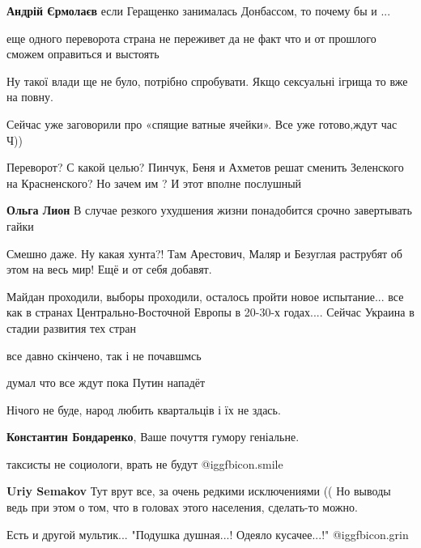 \begin{itemize}
\begin{itemize}
\textbf{Андрій Єрмолаєв} если Геращенко занималась Донбассом, то почему бы и ...
\end{itemize} %

еще одного переворота страна не переживет да не факт что и от прошлого сможем оправиться и выстоять

Ну такої влади ще не було, потрібно спробувати. Якщо сексуальні ігрища то вже на повну.

Сейчас уже заговорили про «спящие ватные ячейки». Все уже готово,ждут час Ч))

Переворот? С какой целью? Пинчук, Беня и Ахметов решат сменить Зеленского на Красненского? Но зачем им ? И этот вполне послушный

\begin{itemize} %
\textbf{Ольга Лион} В случае резкого ухудшения жизни понадобится срочно завертывать гайки
\end{itemize} %

Смешно даже. Ну какая хунта?! Там Арестович, Маляр и Безуглая раструбят об этом на весь мир! Ещё и от себя добавят.


Майдан проходили, выборы проходили, осталось пройти новое испытание... все как в
странах Центрально-Восточной Европы в 20-30-х годах.... Сейчас Украина в стадии
развития тех стран

все давно скінчено, так і не почавшмсь

думал что все ждут пока Путин нападёт

Нічого не буде, народ любить квартальців і їх не здась.

\textbf{Константин Бондаренко}, Ваше почуття гумору геніальне.

таксисты не социологи, врать не будут  @igg{fbicon.smile} 

\begin{itemize} %
\textbf{Uriy Semakov} Тут врут все, за очень редкими исключениями (( Но выводы ведь при этом о том, что в головах этого населения, сделать-то можно.
\end{itemize} %

Есть и другой мультик...
"Подушка душная...!
Одеяло кусачее...!"
 @igg{fbicon.grin} 


\end{itemize}
